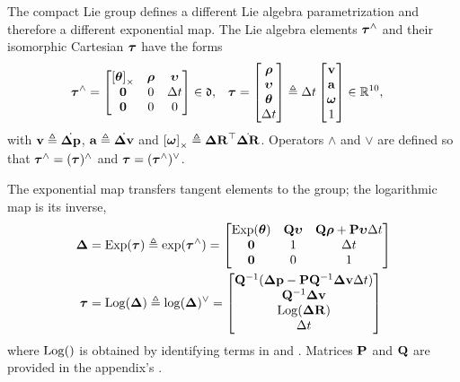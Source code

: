 The compact Lie group defines a different Lie algebra parametrization and therefore a different exponential map.
The Lie algebra elements ${\bm \tau}^\wedge$ and their isomorphic Cartesian ${\bm \tau}$ have the forms
%
\begin{align}
    \label{equ:lie_algebra}
    {\bm \tau}^\wedge &= \begin{bmatrix}
    \left[{{\bm \theta}}\right]_\times & {\bm \rho} & {\bm \upsilon} \\
    \bf0 & 0 & \Delta t \\
    \bf0 & 0 & 0
    \end{bmatrix} \in \mathfrak{d}
    ,&
    {\bm \tau} &= \begin{bmatrix}
    {\bm \rho} \\ {\bm \upsilon} \\ {{\bm \theta}} \\ \Delta t
    \end{bmatrix}
    \triangleq \Delta t \begin{bmatrix}
    {\bf v} \\ {\bf a} \\ {{\bm \omega}} \\ 1
    \end{bmatrix} 
    \in {\mathbb R}^{10}
    ,
\end{align}
%
with ${\bf v}\triangleq\dot{{\bm \Delta {\bf p}}}$, ${\bf a}\triangleq\dot{{\bm \Delta {\bf v}}}$ and $\left[{{\bm \omega}}\right]_\times\triangleq{\bm \Delta {\bf R}}^{\top}\dot{{\bm \Delta {\bf R}}}$.
Operators $\wedge$ and $\vee$ are defined so that ${\bm \tau}^\wedge=({\bm \tau})^\wedge$ and ${\bm \tau}=({\bm \tau}^\wedge)^\vee$.

The exponential map transfers tangent elements to the group; the logarithmic map is its inverse,
%
\begin{align}
    \D &= \Exp(\bftau) \te \exp(\bftau\hhat) = \begin{bmatrix}
    \Exp(\bth) & \bfQ\bfupsilon & \bfQ\bfrho+\bfP\bfupsilon\Dt \\
    \bf0 & 1 & \Dt \\
    \bf0 & 0 & 1
    \end{bmatrix} %
    \label{eq:compact_exp}
    \\
    \bftau &= \Log(\D) \te \log(\D)\vvee = \begin{bmatrix}
    \bfQ\inv(\Dp-\bfP\bfQ\inv\Dv\Dt) \\
    \bfQ\inv\Dv \\
    \Log(\DR) \\
    \Dt 
    \end{bmatrix} %
    \label{eq:compact_log}
\end{align}
%
where $\operatorname*{Log}()$ is obtained by identifying terms in  and .
Matrices ${\bf P}$ and ${\bf Q}$ are provided in the appendix's .


